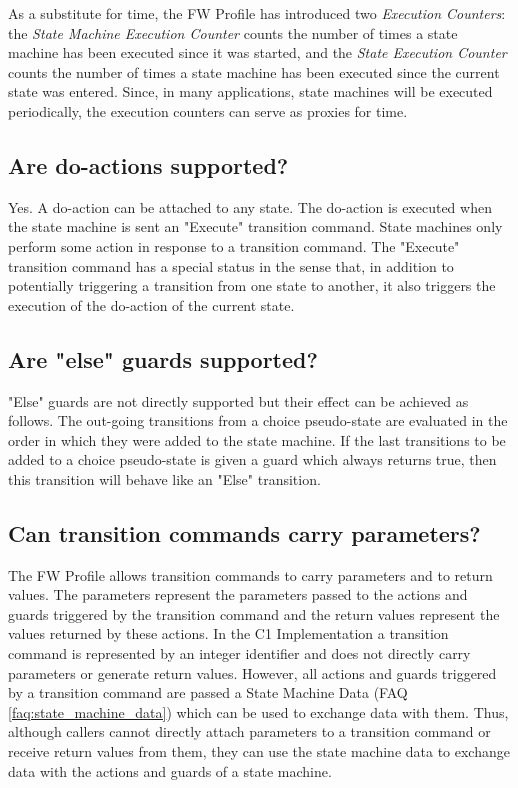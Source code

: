 \documentclass[faq]{../fwprofile}
\begin{document}
As a substitute for time, the FW Profile has introduced two \emph{Execution Counters}: the \emph{State Machine Execution Counter} counts the number 
of times a state machine has been executed since it was started, and the \emph{State Execution Counter} counts the number of times a state machine 
has been executed since the current state was entered. Since, in many applications, state machines will be executed periodically, the execution counters 
can serve as proxies for time.  

\subsection{Are do-actions supported?}
Yes. A do-action can be attached to any state. The do-action is executed when the state machine is sent an "Execute" transition command. State machines 
only perform some action in response to a transition command. The "Execute" transition command has a special status in the sense that, in addition 
to potentially triggering a transition from one state to another, it also triggers the execution of the do-action of the current state.  

\subsection{Are "else" guards supported?}
"Else" guards are not directly supported but their effect can be achieved as follows. The out-going transitions from a choice pseudo-state are evaluated 
in the order in which they were added to the state machine. If the last transitions to be added to a choice pseudo-state is given a guard which always 
returns true, then this transition will behave like an "Else" transition.

\subsection{Can transition commands carry parameters?}
The FW Profile allows transition commands to carry parameters and to return values. The parameters represent the parameters passed to the actions 
and guards triggered by the transition command and the return values represent the values returned by these actions. In the C1 Implementation 
a transition command is represented by an integer identifier and does not directly carry parameters or generate return values. However, all actions 
and guards triggered by a transition command are passed a State Machine Data (FAQ \ref{faq:state_machine_data}) which can be used to exchange data with them. 
Thus, although callers cannot directly attach parameters to a transition command or receive return values from them, they can use the state machine 
data to exchange data with the actions and guards of a state machine.
\end{document}
